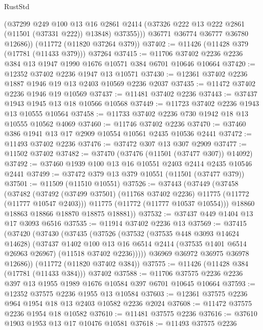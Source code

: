 \begin{lexlean}{RustStd}
\begin{coremodule}
            (@37299
              @249
              @100
              @13
              @16
              @2861
              @2414
              (@37326 @222 @13 @222 @2861 (@11501 (@37331 @222)) @13848)
              @37355)))
        @36771
        @36774
        @36777
        @36780
        @12686))
    (@11772 (@11820 @37264 @379))
@37402 := @11426 (@11428 @379 (@17781 (@11433 @379))) @37264
@37415 := @11706 @37402 @2236 @2236 @384 @13 @1947 @1990 @1676 @10571 @384 @6701 @10646 @10664
@37420 := @12352 @37402 @2236 @1947 @13 @10571
@37430 := @12361 @37402 @2236 @1887 @1946 @19 @13 @2403 @10569 @2236 @2037
@37435 := @11472 @37402 @2236 @1946 @19 @10569
@37437 := @11481 @37402 @2236
@37443 := @37437 @1943 @1945 @13 @18 @10566 @10568
@37449 := @11723 @37402 @2236 @1943 @13 @10555 @10564
@37458 := @11733 @37402 @2236 @730 @1942 @18 @13 @10555 @10562 @4069
@37460 := @11746 @37402 @2236
@37470 := @37460 @386 @1941 @13 @17 @2909 @10554 @10561 @2435 @10536 @2441
@37472 := @11493 @37402 @2236
@37476 := @37472 @307 @13 @307 @2909
@37477 := @11502 @37402
@37482 := @37470 (@37476 (@11501 (@37477 @307)) @14092)
@37492 := @37460 @1939 @100 @13 @16 @10551 @2403 @2414 @2435 @10546 @2441
@37499 := @37472 @379 @13 @379 @10551 (@11501 (@37477 @379))
@37501 := @11509 (@11510 @10551)
@37526 := @37443
    (@37449
      (@37458
        (@37482
          (@37492 (@37499 @37501) (@11768 @37402 @2236) @11775 (@11772 (@11777 @10547 @2403)))
          @11775
          (@11772 (@11777 @10537 @10554)))
        @18860
        @18863
        @18866
        @18870
        @18875
        @18881))
@37532 := @37437 @449 @1404 @13 @17 @3093 @6516
@37535 := @11914 @37402 @2236 @13
@37569 := @37415
    (@37420
      (@37430
        (@37435
          (@37526
            (@37532
              (@37535 @448 @3093 @14624 @14628)
              (@37437
                @1402
                @100
                @13
                @16
                @6514
                @2414
                (@37535 @1401 @6514 @26963 @26967)
                (@11518 @37402 @2236)))))
        @36969
        @36972
        @36975
        @36978
        @12686))
    (@11772 (@11820 @37402 @384))
@37575 := @11426 (@11428 @384 (@17781 (@11433 @384))) @37402
@37588 := @11706 @37575 @2236 @2236 @397 @13 @1955 @1989 @1676 @10584 @397 @6701 @10645 @10664
@37593 := @12352 @37575 @2236 @1955 @13 @10584
@37603 := @12361 @37575 @2236 @964 @1954 @18 @13 @2403 @10582 @2236 @2024
@37608 := @11472 @37575 @2236 @1954 @18 @10582
@37610 := @11481 @37575 @2236
@37616 := @37610 @1903 @1953 @13 @17 @10476 @10581
@37618 := @11493 @37575 @2236

\end{coremodule}
\end{lexlean}
